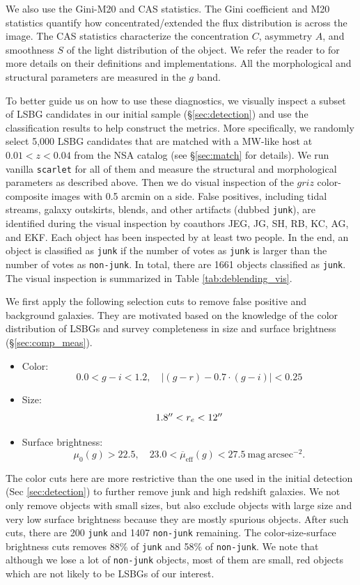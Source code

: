 \documentclass[twocolumn,astrosymb,twocolappendix]{aastex631}
\newcommand{\sbunit}{\mathrm{mag\ arcsec}^{-2}}
\newcommand{\sbeff}{\overline{\mu}_{\mathrm{eff}}(g)}
\newcommand{\code}[1]{\texttt{#1}}
\begin{document}
\begin{CJK*}{UTF8}{gbsn}
We also use the Gini-M20 and CAS statistics. The Gini coefficient and M20 statistics \citep{Abraham2003,Lotz2004} quantify how concentrated/extended the flux distribution is across the image. The CAS statistics characterize the concentration $C$, asymmetry $A$, and smoothness $S$ of the light distribution of the object. We refer the reader to \citet{statmorph} for more details on their definitions and implementations. All the morphological and structural parameters are measured in the $g$ band.


To better guide us on how to use these diagnostics, we visually inspect a subset of LSBG candidates in our initial sample (\S \ref{sec:detection}) and use the classification results to help construct the metrics. More specifically, we randomly select 5,000 LSBG candidates that are matched with a MW-like host at $0.01 < z < 0.04$ from the NSA catalog (see \S\ref{sec:match} for details). We run vanilla \code{scarlet} for all of them and measure the structural and morphological parameters as described above. Then we do visual inspection of the $griz$ color-composite images with 0.5 arcmin on a side. False positives, including tidal streams, galaxy outskirts, blends, and other artifacts (dubbed \code{junk}), are identified during the visual inspection by coauthors JEG, JG, SH, RB, KC, AG, and EKF. Each object has been inspected by at least two people. In the end, an object is classified as \code{junk} if the number of votes as \code{junk} is larger than the number of votes as \code{non-junk}. In total, there are 1661 objects classified as \code{junk}. The visual inspection is summarized in Table \ref{tab:deblending_vis}.


We first apply the following selection cuts to remove false positive and background galaxies. They are motivated based on the knowledge of the color distribution of LSBGs \citep[e.g.,][]{SAGA-I,Greco2018,Zaritsky2019,Tanoglidis2021} and survey completeness in size and surface brightness (\S\ref{sec:comp_meas}). 
\begin{itemize}
    \item Color:
    \[0.0 < g-i < 1.2,\quad |(g-r) - 0.7\cdot (g-i)| < 0.25\]
    \item Size: \[1.8 \mbox{$^{\prime\prime}$} < r_e < 12 \mbox{$^{\prime\prime}$}\]
    \item Surface brightness: \[\mu_0(g) > 22.5,\quad 23.0 < \sbeff < 27.5\ \sbunit.\]
\end{itemize}
The color cuts here are more restrictive than the one used in the initial detection (Sec \ref{sec:detection}) to further remove junk and high redshift galaxies. We not only remove objects with small sizes, but also exclude objects with large size and very low surface brightness because they are mostly spurious objects.
After such cuts, there are 200 \code{junk} and 1407 \code{non-junk} remaining. The color-size-surface brightness cuts removes 88\% of \code{junk} and 58\% of \code{non-junk}. We note that although we lose a lot of \code{non-junk} objects, most of them are small, red  objects which are not likely to be LSBGs of our interest. 



\end{CJK*}
\end{document}
